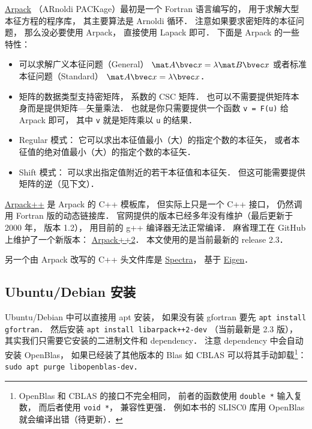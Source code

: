 

\href{https://www.caam.rice.edu/software/ARPACK/}{Arpack} （ARnoldi PACKage）最初是一个 Fortran 语言编写的， 用于求解大型本征方程的程序库， 其主要算法是 Arnoldi 循环． 注意如果要求密矩阵的本征问题， 那么没必要使用 Arpack， 直接使用 Lapack 即可． 下面是 Arpack 的一些特性：
\begin{itemize}
\item 可以求解广义本征问题（General） $\mat A\bvec x = \lambda \mat B\bvec x$ 或者标准本征问题（Standard） $\mat A\bvec x = \lambda \bvec x$．
\item 矩阵的数据类型支持密矩阵， 系数的 CSC 矩阵． 也可以不需要提供矩阵本身而是提供矩阵—矢量乘法． 也就是你只需要提供一个函数 \verb|v = F(u)| 给 Arpack 即可， 其中 \verb|v| 就是矩阵乘以 \verb|u| 的结果．
\item Regular 模式： 它可以求出本征值最小（大）的指定个数的本征矢， 或者本征值的绝对值最小（大）的指定个数的本征矢．
\item Shift 模式： 可以求出指定值附近的若干本征值和本征矢． 但这可能需要提供矩阵的逆（见下文）．
\end{itemize}

\href{http://www.ime.unicamp.br/~chico/arpack++/}{Arpack++} 是 Arpack 的 C++ 模板库， 但实际上只是一个 C++ 接口， 仍然调用 Fortran 版的动态链接库． 官网提供的版本已经多年没有维护（最后更新于 2000 年， 版本 1.2）， 用目前的 g++ 编译器无法正常编译． 麻省理工在 GitHub 上维护了一个新版本： \href{https://github.com/m-reuter/arpackpp}{Arpack++2}． 本文使用的是当前最新的 release 2.3．

另一个由 Arpack 改写的 C++ 头文件库是 \href{https://spectralib.org/}{Spectra}， 基于 \href{https://eigen.tuxfamily.org/index.php?title=Main_Page}{Eigen}．

\subsection{Ubuntu/Debian 安装}
Ubuntu/Debian 中可以直接用 apt 安装， 如果没有装 gfortran 要先 \verb|apt install gfortran|． 然后安装 \verb|apt install libarpack++2-dev| （当前最新是 2.3 版）， 其实我们只需要它安装的二进制文件和 dependency． 注意 dependency 中会自动安装 OpenBlas， 如果已经装了其他版本的 Blas 如 CBLAS 可以将其手动卸载\footnote{OpenBlas 和 CBLAS 的接口不完全相同， 前者的函数使用 \lstinline|double *| 输入复数， 而后者使用 \lstinline|void *|， 兼容性更强． 例如本书的 SLISC0 库用 OpenBlas 就会编译出错（待更新）．}： \verb|sudo apt purge libopenblas-dev|．

